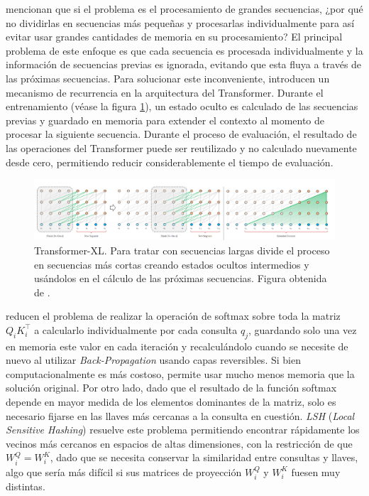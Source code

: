 \citeauthor{DBLP:journals/corr/abs-1901-02860} mencionan que si el problema es el procesamiento de
grandes secuencias, ¿por qué no dividirlas en secuencias más pequeñas y procesarlas individualmente
para así evitar usar grandes cantidades de memoria en su procesamiento? El principal problema de este
enfoque es que cada secuencia es procesada individualmente y la información de secuencias previas es
ignorada, evitando que esta fluya a través de las próximas secuencias. Para solucionar este
inconveniente, introducen un mecanismo de recurrencia en la arquitectura del Transformer. Durante el
entrenamiento (véase la figura \ref{fig:trans-xl}), un estado oculto es calculado de las secuencias previas y guardado
en memoria para extender el contexto al momento de procesar la siguiente secuencia. Durante el
proceso de evaluación, el resultado de las operaciones del Transformer puede ser reutilizado y no
calculado nuevamente desde cero, permitiendo reducir considerablemente el tiempo de evaluación.

\begin{figure}[ht!]
    \centering
    \includegraphics[width=0.8 \textwidth]{Chapters/2. Transformer/Figures/transformer/trans-XL.png}
    \caption{Transformer-XL. Para tratar con secuencias largas divide el proceso en secuencias más
             cortas creando estados ocultos intermedios y usándolos en el cálculo de las próximas
             secuencias. Figura obtenida de \cite{DBLP:journals/corr/abs-1901-02860}.}
    \label{fig:trans-xl}
\end{figure}

\citeauthor{DBLP:journals/corr/abs-2001-04451} reducen el problema de realizar la operación de softmax
sobre toda la matriz $Q_i K_i^\top$ a calcularlo individualmente por cada consulta $q_j$, guardando
solo una vez en memoria este valor en cada iteración y recalculándolo cuando se necesite de nuevo
al utilizar \textit{Back-Propagation} usando capas reversibles. Si bien computacionalmente es
más costoso, permite usar mucho menos memoria que la solución original. Por otro lado, dado que el
resultado de la función softmax depende en mayor medida de los elementos dominantes de la matriz,
solo es necesario fijarse en las llaves más cercanas a la consulta en cuestión. \textit{LSH}
(\textit{Local Sensitive Hashing}) resuelve este problema permitiendo encontrar rápidamente los
vecinos más cercanos en espacios de altas dimensiones, con la restricción de que $W_i^Q = W_i^K$,
dado que se necesita conservar la similaridad entre consultas y llaves, algo que sería más difícil
si sus matrices de proyección $W_i^Q$ y $W_i^K$ fuesen muy distintas.



